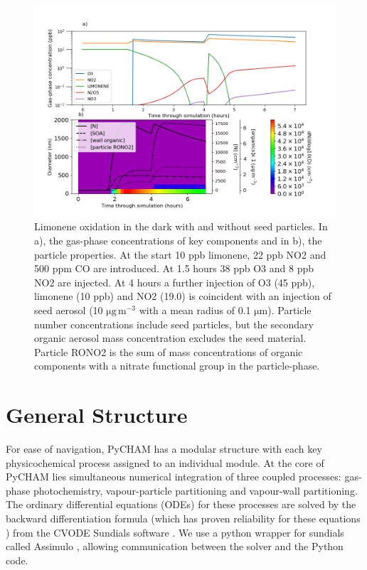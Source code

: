 \documentclass[gmd, manuscript]{copernicus}
\begin{document}
\begin{figure}[t]
\includegraphics[width=12.0cm]{Results/limonene_res_plot.png}
\caption{Limonene oxidation in the dark with and without seed particles.  In a), the gas-phase concentrations of key components and in b), the particle properties.  At the start 10 ppb limonene, 22 ppb NO2 and 500 ppm CO are introduced.  At 1.5 hours 38 ppb O3 and 8 ppb NO2 are injected.  At 4 hours a further injection of O3 (45 ppb), limonene (10 ppb) and NO2 (19.0) is coincident with an injection of seed aerosol (10 $\mathrm{\mu g\, m^{-3}}$ with a mean radius of 0.1 $\mathrm{\mu m}$).  Particle number concentrations include seed particles, but the secondary organic aerosol mass concentration excludes the seed material.  Particle RONO2 is the sum of mass concentrations of organic components with a nitrate functional group in the particle-phase.}
\label{fig:limonene_output_plot}
\end{figure}

\section{General Structure}

For ease of navigation, PyCHAM has a modular structure with each key physicochemical process assigned to an individual module.  At the core of PyCHAM lies simultaneous numerical integration of three coupled processes: gas-phase photochemistry, vapour-particle partitioning and vapour-wall partitioning.  The ordinary differential equations (ODEs) for these processes are solved by the backward differentiation formula (which has proven reliability for these equations \citep{Jacobson2005}) from the CVODE Sundials software \citep{hindmarsh2005sundials}.  We use a python wrapper for sundials called Assimulo \citep{Andersson2015}, allowing communication between the solver and the Python code.
\end{document}
